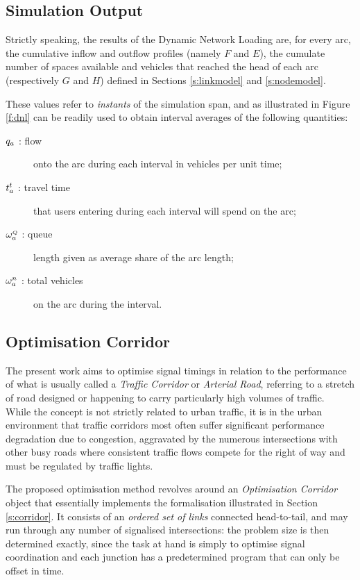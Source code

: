 \subsection{Simulation Output} \label{s:output}
Strictly speaking, the results of the Dynamic Network Loading are, for every arc, the cumulative inflow and outflow profiles (namely $F$ and $E$), the cumulate number of spaces available and vehicles that reached the head of each arc (respectively $G$ and $H$) defined in Sections \ref{s:linkmodel} and \ref{s:nodemodel}.

These values refer to \emph{instants} of the simulation span, and as illustrated in Figure \ref{f:dnl}  can be readily used to obtain interval averages of the following quantities:
\begin{description}
\item[$q_a$ : flow]  onto the arc during each interval in vehicles per unit time;

\item[$t_{a}^t$ : travel time]  that users entering during each interval will spend on the arc; 

\item[$\omega_{a}^{\scriptscriptstyle{Q}}$ : queue] length given as average share of the arc length;

\item[$\omega_{a}^{n}$ : total vehicles] on the arc during the interval.
\end{description}


\subsection{Optimisation Corridor}
The present work aims to optimise signal timings in relation to the performance of what is usually called a \emph{Traffic Corridor} or \emph{Arterial Road}, referring to a stretch of road designed or happening to carry particularly high volumes of traffic. \\
While the concept is not strictly related to urban traffic, it is in the urban environment that traffic corridors most often suffer significant performance degradation due to congestion, aggravated by the numerous intersections with other busy roads where consistent traffic flows compete for the right of way and must be regulated by traffic lights.

The proposed optimisation method revolves around an \emph{Optimisation Corridor} object that essentially implements the formalisation illustrated in Section \ref{s:corridor}. It consists of an \emph{ordered set of links} connected head-to-tail, and may run through any number of signalised intersections: the problem size is then determined exactly, since the task at hand is simply to optimise signal coordination and each junction has a predetermined program that can only be offset in time.

